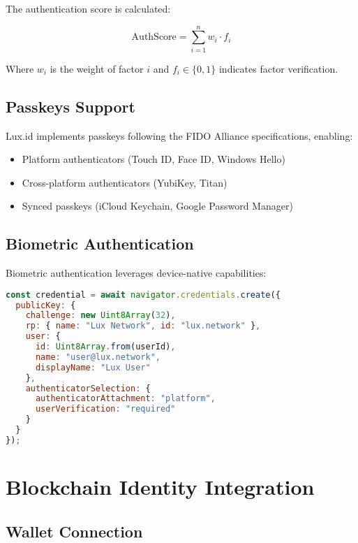 \documentclass[11pt,a4paper]{article}
\begin{document}
The authentication score is calculated:

\begin{equation}
    \text{AuthScore} = \sum_{i=1}^{n} w_i \cdot f_i
\end{equation}

Where $w_i$ is the weight of factor $i$ and $f_i \in \{0,1\}$ indicates factor verification.

\subsection{Passkeys Support}

Lux.id implements passkeys following the FIDO Alliance specifications, enabling:

\begin{itemize}
    \item Platform authenticators (Touch ID, Face ID, Windows Hello)
    \item Cross-platform authenticators (YubiKey, Titan)
    \item Synced passkeys (iCloud Keychain, Google Password Manager)
\end{itemize}

\subsection{Biometric Authentication}

Biometric authentication leverages device-native capabilities:

\begin{lstlisting}[language=JavaScript]
const credential = await navigator.credentials.create({
  publicKey: {
    challenge: new Uint8Array(32),
    rp: { name: "Lux Network", id: "lux.network" },
    user: {
      id: Uint8Array.from(userId),
      name: "user@lux.network",
      displayName: "Lux User"
    },
    authenticatorSelection: {
      authenticatorAttachment: "platform",
      userVerification: "required"
    }
  }
});
\end{lstlisting}

\section{Blockchain Identity Integration}

\subsection{Wallet Connection}
\end{document}
